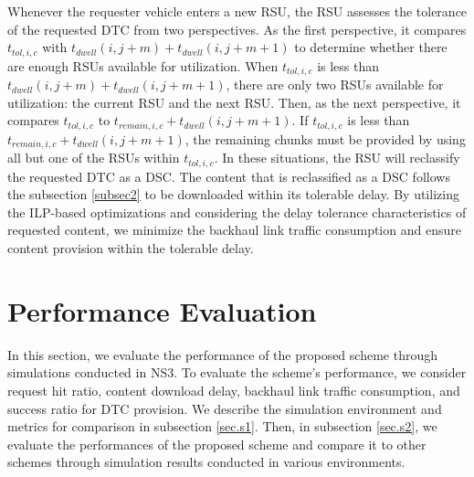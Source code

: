 \documentclass[journal]{IEEEtran}
\begin{document}
Whenever the requester vehicle enters a new RSU, the RSU assesses the tolerance of the requested DTC from two perspectives.
As the first perspective, it compares $t_{tol,i,c}$ with $t_{dwell}(i,j+m) + t_{dwell}(i,j+m+1)$ to determine whether there are enough RSUs available for utilization.
When $t_{tol,i,c}$ is less than $t_{dwell}(i,j+m) + t_{dwell}(i,j+m+1)$, there are only two RSUs available for utilization: the current RSU and the next RSU.
Then, as the next perspective, it compares $t_{tol,i,c}$ to $t_{remain,i,c} + t_{dwell}(i,j+m+1)$.
If $t_{tol,i,c}$ is less than $t_{remain,i,c} + t_{dwell}(i,j+m+1)$, the remaining chunks must be provided by using all but one of the RSUs within $t_{tol,i,c}$.
In these situations, the RSU will reclassify the requested DTC as a DSC.
The content that is reclassified as a DSC follows the subsection \ref{subsec2} to be downloaded within its tolerable delay.
By utilizing the ILP-based optimizations and considering the delay tolerance characteristics of requested content, we minimize the backhaul link traffic consumption and ensure content provision within the tolerable delay.



\section{Performance Evaluation} \label{sec.perf}
In this section, we evaluate the performance of the proposed scheme through simulations conducted in NS3.
To evaluate the scheme's performance, we consider request hit ratio, content download delay, backhaul link traffic consumption, and success ratio for DTC provision.
We describe the simulation environment and metrics for comparison in subsection \ref{sec.s1}.
Then, in subsection \ref{sec.s2}, we evaluate the performances of the proposed scheme and compare it to other schemes through simulation results conducted in various environments.
\end{document}
